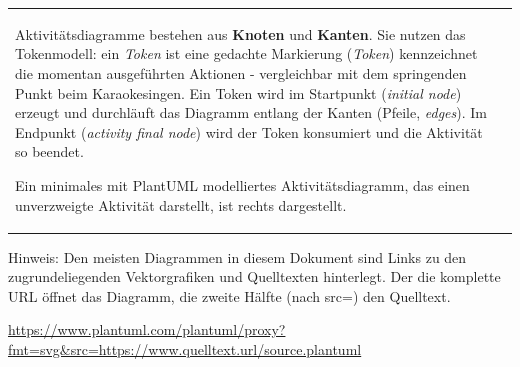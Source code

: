 \documentclass[10pt]{scrartcl}
\begin{document}
\begin{tabular}[b]{p{10cm} p{7cm}}
Aktivitätsdiagramme bestehen aus \textbf{Knoten} und \textbf{Kanten}. Sie nutzen das Tokenmodell: ein \textit{Token} ist eine gedachte Markierung (\textit{Token}) kennzeichnet die momentan ausgeführten Aktionen - vergleichbar mit dem springenden Punkt beim Karaokesingen. Ein Token wird im Startpunkt (\textit{initial node}) erzeugt und durchläuft das Diagramm entlang der Kanten (Pfeile, \textit{edges}). Im Endpunkt (\textit{activity final node}) wird der Token konsumiert und die Aktivität so beendet.

Ein minimales mit PlantUML modelliertes Aktivitätsdiagramm, das einen unverzweigte Aktivität darstellt, ist rechts dargestellt.

	&
	
\end{tabular}
Hinweis: Den meisten Diagrammen in diesem Dokument sind Links zu den zugrundeliegenden Vektorgrafiken und Quelltexten hinterlegt. Der die komplette URL öffnet das Diagramm, die zweite Hälfte (nach src=) den Quelltext.

\href{http://www.plantuml.com/plantuml/proxy?fmt=svg&src=https://raw.githubusercontent.com/hannsens/plantUML-Activity-Infosheet/master/plantuml/01_aktion_start_stop.plantuml}{https://www.plantuml.com/plantuml/proxy?fmt=svg\&src=https://www.quelltext.url/source.plantuml}
\end{document}
